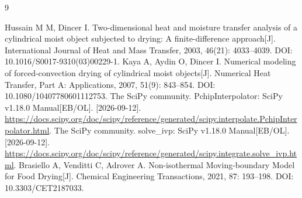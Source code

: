 \begin{thebibliography}{9}
\small\raggedright
{} Hussain M M, Dincer I. Two-dimensional heat and moisture transfer analysis of a cylindrical moist object subjected to drying: A finite-difference approach[J]. International Journal of Heat and Mass Transfer, 2003, 46(21): 4033--4039. DOI: 10.1016/S0017-9310(03)00229-1.
 Kaya A, Aydin O, Dincer I. Numerical modeling of forced-convection drying of cylindrical moist objects[J]. Numerical Heat Transfer, Part A: Applications, 2007, 51(9): 843--854. DOI: 10.1080/10407780601112753.
 The SciPy community. PchipInterpolator: SciPy v1.18.0 Manual[EB/OL]. [2026-09-12]. \url{https://docs.scipy.org/doc/scipy/reference/generated/scipy.interpolate.PchipInterpolator.html}.
 The SciPy community. solve\_ivp: SciPy v1.18.0 Manual[EB/OL]. [2026-09-12]. \url{https://docs.scipy.org/doc/scipy/reference/generated/scipy.integrate.solve_ivp.html}.
 Brasiello A, Venditti C, Adrover A. Non-isothermal Moving-boundary Model for Food Drying[J]. Chemical Engineering Transactions, 2021, 87: 193--198. DOI: 10.3303/CET2187033.
\end{thebibliography}

